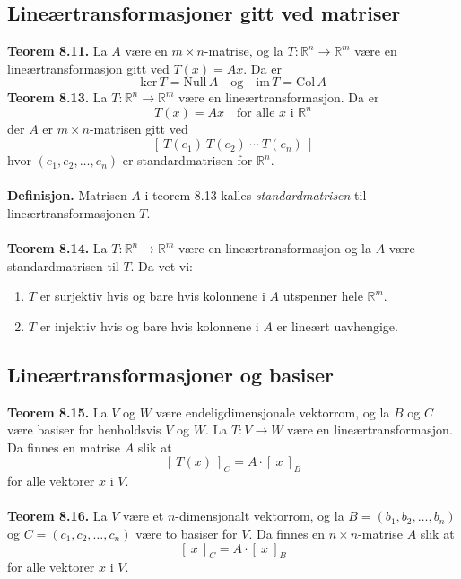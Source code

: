 \documentclass{article}
\begin{document}
\subsection{Lineærtransformasjoner gitt ved matriser}
\textbf{Teorem 8.11.} La $A$ være en $m \times n$-matrise, og la $T: \mathbb{R}^n \rightarrow \mathbb{R}^m$ være en lineærtransformasjon gitt ved $T(x) = Ax$. Da er
\[ \text{ker}\,T = \text{Null}\,A \quad \text{og} \quad \text{im}\,T=\text{Col}\,A \]
\textbf{Teorem 8.13.} La $T: \mathbb{R}^n \rightarrow \mathbb{R}^m$ være en lineærtransformasjon. Da er
\[ T(x) = Ax \quad \text{for alle } x \text{ i } \mathbb{R}^n \]
der $A$ er $m \times n$-matrisen gitt ved
\[ [ \ T(e_1) \ T(e_2) \ \cdots \ T(e_n) \ ] \]
hvor $(e_1, e_2, \dots, e_n)$ er standardmatrisen for $\mathbb{R}^n$.
\\\\
\textbf{Definisjon.} Matrisen $A$ i teorem 8.13 kalles \textit{standardmatrisen} til lineærtransformasjonen $T$.
\\\\
\textbf{Teorem 8.14.} La $T: \mathbb{R}^n \rightarrow \mathbb{R}^m$ være en lineærtransformasjon og la $A$ være standardmatrisen til $T$. Da vet vi:
\begin{enumerate}
    \item $T$ er surjektiv hvis og bare hvis kolonnene i $A$ utspenner hele $\mathbb{R}^m$.
    \item $T$ er injektiv hvis og bare hvis kolonnene i $A$ er lineært uavhengige.
\end{enumerate}


\subsection{Lineærtransformasjoner og basiser}
\textbf{Teorem 8.15.} La $V$ og $W$ være endeligdimensjonale vektorrom, og la $B$ og $C$ være basiser for henholdsvis $V$ og $W$. La $T: V \rightarrow W$ være en lineærtransformasjon. Da finnes en matrise $A$ slik at
\[ [ \ T(x) \ ]_C = A \cdot [ \ x \ ]_B \]
for alle vektorer $x$ i $V$.
\\\\
\textbf{Teorem 8.16.} La $V$ være et $n$-dimensjonalt vektorrom, og la $B = (b_1, b_2, \dots, b_n)$ og $C = (c_1, c_2, \dots, c_n)$ være to basiser for $V$. Da finnes en $n \times n$-matrise $A$ slik at
\[ [ \ x \ ]_C = A \cdot [ \ x \ ]_B \]
for alle vektorer $x$ i $V$.
\end{document}
